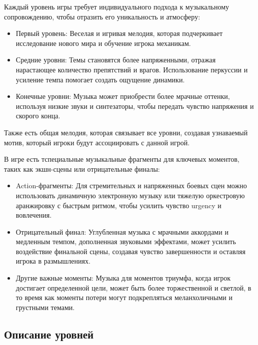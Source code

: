 \documentclass[a4paper,12pt]{article}
\begin{document}
Каждый уровень игры требует индивидуального подхода к музыкальному сопровождению, чтобы отразить его уникальность и атмосферу:
\begin{itemize}
    \item Первый уровень: Веселая и игривая мелодия, которая подчеркивает исследование нового мира и обучение игрока механикам.
    \item Средние уровни: Темы становятся более напряженными, отражая нарастающее количество препятствий и врагов. Использование перкуссии и усиление темпа помогает создать ощущение динамики.
    \item Конечные уровни: Музыка может приобрести более мрачные оттенки, используя низкие звуки и синтезаторы, чтобы передать чувство напряжения и скорого конца.
\end{itemize}
Также есть общая мелодия, которая связывает все уровни, создавая узнаваемый мотив, который игроки будут ассоциировать с данной игрой.


В игре есть тспециальные музыкальные фрагменты для ключевых моментов, таких как экшн-сцены или отрицательные финалы:
\begin{itemize}
    \item Action-фрагменты: Для стремительных и напряженных боевых сцен можно использовать динамичную электронную музыку или тяжелую оркестровую аранжировку с быстрым ритмом, чтобы усилить чувство urgency и вовлечения.
    \item Отрицательный финал: Углубленная музыка с мрачными аккордами и медленным темпом, дополненная звуковыми эффектами, может усилить воздействие финальной сцены, создавая чувство завершенности и оставляя игрока в размышлениях.
    \item Другие важные моменты: Музыка для моментов триумфа, когда игрок достигает определенной цели, может быть более торжественной и светлой, в то время как моменты потери могут подкрепляться меланхоличными и грустными темами.
\end{itemize}

\subsection{Описание уровней}
\end{document}
